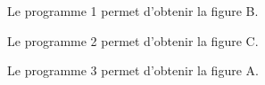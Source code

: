 \documentclass[10pt]{article}
\begin{document}
\begin{enumerate}
%
%
%
%
%
Le programme 1 permet d'obtenir la figure B.

Le programme 2 permet d'obtenir la figure C.

Le programme 3 permet d'obtenir la figure A.
\end{enumerate}

\vspace{0.5cm}
\end{document}
